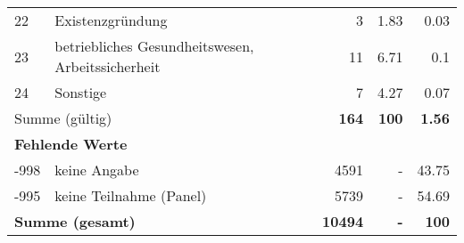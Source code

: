 \begin{longtable}{lXrrr}
        22 & \multicolumn{1}{X}{Existenzgründung} & %
          \num{3} &
          \num[round-mode=places,round-precision=2]{1,83} &
          \num[round-mode=places,round-precision=2]{0,03} \\

        23 & \multicolumn{1}{X}{betriebliches Gesundheitswesen, Arbeitssicherheit} & %
          \num{11} &
          \num[round-mode=places,round-precision=2]{6,71} &
          \num[round-mode=places,round-precision=2]{0,1} \\

        24 & \multicolumn{1}{X}{Sonstige} & %
          \num{7} &
          \num[round-mode=places,round-precision=2]{4,27} &
          \num[round-mode=places,round-precision=2]{0,07} \\

     \midrule
     \multicolumn{2}{l}{Summe (gültig)} &
       \textbf{\num{164}} &
     \textbf{100} &
       \textbf{\num[round-mode=places,round-precision=2]{1,56}} \\
     \multicolumn{5}{l}{\textbf{Fehlende Werte}}\\
       -998 &
       keine Angabe &
         \num{4591} &
        - &
         \num[round-mode=places,round-precision=2]{43,75} \\
       -995 &
       keine Teilnahme (Panel) &
         \num{5739} &
        - &
         \num[round-mode=places,round-precision=2]{54,69} \\
     \midrule
     \multicolumn{2}{l}{\textbf{Summe (gesamt)}} &
          \textbf{\num{10494}} &
        \textbf{-} &
        \textbf{100} \\
     \bottomrule
     \end{longtable}
     
